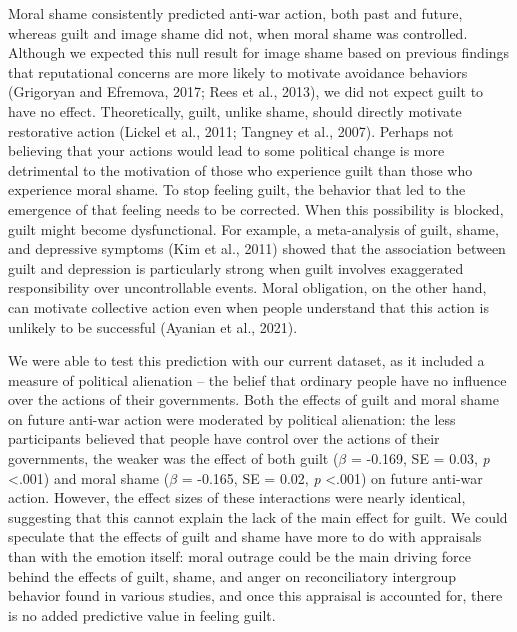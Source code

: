 \documentclass[
]{article}
\begin{document}
Moral shame consistently predicted anti-war action, both past and future, whereas guilt and image shame did not, when moral shame was controlled. Although we expected this null result for image shame based on previous findings that reputational concerns are more likely to motivate avoidance behaviors (Grigoryan and Efremova, 2017; Rees et al., 2013), we did not expect guilt to have no effect. Theoretically, guilt, unlike shame, should directly motivate restorative action (Lickel et al., 2011; Tangney et al., 2007). Perhaps not believing that your actions would lead to some political change is more detrimental to the motivation of those who experience guilt than those who experience moral shame. To stop feeling guilt, the behavior that led to the emergence of that feeling needs to be corrected. When this possibility is blocked, guilt might become dysfunctional. For example, a meta-analysis of guilt, shame, and depressive symptoms (Kim et al., 2011) showed that the association between guilt and depression is particularly strong when guilt involves exaggerated responsibility over uncontrollable events. Moral obligation, on the other hand, can motivate collective action even when people understand that this action is unlikely to be successful (Ayanian et al., 2021).

We were able to test this prediction with our current dataset, as it included a measure of political alienation -- the belief that ordinary people have no influence over the actions of their governments. Both the effects of guilt and moral shame on future anti-war action were moderated by political alienation: the less participants believed that people have control over the actions of their governments, the weaker was the effect of both guilt (\(\beta\) = -0.169, SE = 0.03, \emph{p} \textless.001) and moral shame (\(\beta\) = -0.165, SE = 0.02, \emph{p} \textless.001) on future anti-war action. However, the effect sizes of these interactions were nearly identical, suggesting that this cannot explain the lack of the main effect for guilt. We could speculate that the effects of guilt and shame have more to do with appraisals than with the emotion itself: moral outrage could be the main driving force behind the effects of guilt, shame, and anger on reconciliatory intergroup behavior found in various studies, and once this appraisal is accounted for, there is no added predictive value in feeling guilt.
\end{document}
